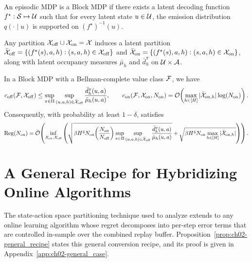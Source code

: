 \begin{defn}
\label{defn:ch02-block_MDP}
An episodic MDP is a Block MDP if there exists a latent decoding function $f^\star: {\mathcal{S}} \mapsto {\mathcal{U}}$ such that for every latent state $u \in {\mathcal{U}}$, the emission distribution $q(\cdot \mid u)$ is supported on $(f^\star)^{-1}(u)$.
\end{defn}

Any partition ${\mathcal{X}}_{{\operatorname{off}}} \cup {\mathcal{X}}_{{\operatorname{on}}} = {\mathcal{X}}$ induces a latent partition $\bar{{\mathcal{X}}}_{{\operatorname{off}}} = \{(f^\star(s), a, h) : (s, a, h) \in {\mathcal{X}}_{{\operatorname{off}}}\}$ and $\bar{{\mathcal{X}}}_{{\operatorname{on}}} = \{(f^\star(s), a, h) : (s, a, h) \in {\mathcal{X}}_{{\operatorname{on}}}\}$, along with latent occupancy measures $\bar{\mu}_h$ and $\bar{d}^\pi_h$ on ${\mathcal{U}} \times {\mathcal{A}}$.

\begin{prop}
\label{prop:ch02-BMDP_bound}
In a Block MDP with a Bellman-complete value class ${\mathcal{F}}$, we have
\begin{equation}
    c_{{\operatorname{off}}}({\mathcal{F}}, {\mathcal{X}}_{{\operatorname{off}}}) \leq \sup_{\pi \in \Pi}\sup_{(u, a, h) \in \bar{{\mathcal{X}}}_{{\operatorname{off}}}} \frac{\bar{d}_h^{\pi}(u, a)}{\bar{\mu}_h(u, a)}, \qquad
    c_{{\operatorname{on}}}({\mathcal{F}}, {\mathcal{X}}_{{\operatorname{on}}}, N_{{\operatorname{on}}}) = {\mathcal{O}}\!\left(\max_{h \in [H]}|\bar{{\mathcal{X}}}_{{\operatorname{on}}, h}| \log(N_{{\operatorname{on}}})\right).
\end{equation}
Consequently, with probability at least $1-\delta$,  satisfies
\begin{equation}
    \operatorname{Reg}(N_{{\operatorname{on}}})
    = \tilde{{\mathcal{O}}}\!\left(\inf_{{\mathcal{X}}_{{\operatorname{on}}}, {\mathcal{X}}_{{\operatorname{off}}}} \left(\sqrt{\beta H^4 N_{{\operatorname{on}}}\!\left(\frac{N_{{\operatorname{on}}}}{N_{{\operatorname{off}}}}\right) \sup_{\pi \in \Pi}\sup_{(u, a, h) \in \bar{{\mathcal{X}}}_{{\operatorname{off}}}} \frac{\bar{d}_h^{\pi}(u, a)}{\bar{\mu}_h(u, a)}}  + \sqrt{\beta H^4 N_{{\operatorname{on}}}\max_{h \in [H]}|\bar{{\mathcal{X}}}_{{\operatorname{on}}, h}| }\right)\right).
\end{equation}
\end{prop}

\section{A General Recipe for Hybridizing Online Algorithms}
\label{sec:ch02-gfa-recipe}

The state-action space partitioning technique used to analyze  extends to any online learning algorithm whose regret decomposes into per-step error terms that are controlled in-sample over the combined replay buffer. Proposition~\ref{prop:ch02-general_recipe} states this general conversion recipe, and its proof is given in Appendix~\ref{app:ch02-general_case}.

